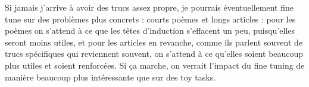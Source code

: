 \documentclass{article}
\begin{document}
Si jamais j'arrive à avoir des trucs assez propre, je pourrais éventuellement fine tune sur des problèmes plus concrets : courts poèmes et longs articles : pour les poèmes on s'attend à ce que les têtes d'induction s'effacent un peu, puisqu'elles seront moins utiles, et pour les articles en revanche, comme ils parlent souvent de trucs spécifiques qui reviennent souvent, on s'attend à ce qu'elles soient beaucoup plus utiles et soient renforcées. Si ça marche, on verrait l'impact du fine tuning de manière beaucoup plus intéressante que sur des toy tasks.
\end{document}
